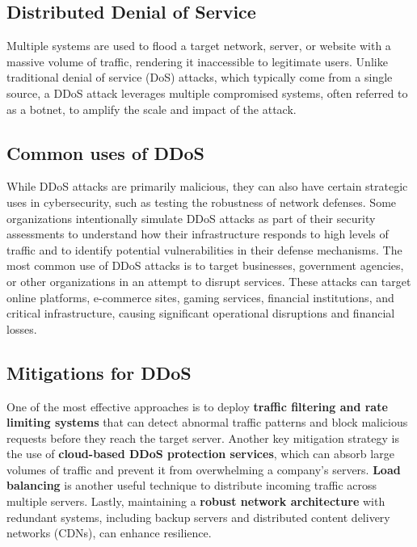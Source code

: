 \begin{center}
    \section{Distributed Denial of Service}
\end{center}
Multiple systems are used to flood a target network, server, or website with a massive volume of traffic, rendering it inaccessible to legitimate users. Unlike traditional denial of service (DoS) attacks, which typically come from a single source, a DDoS attack leverages multiple compromised systems, often referred to as a botnet, to amplify the scale and impact of the attack.

\subsection{Common uses of DDoS}
While DDoS attacks are primarily malicious, they can also have certain strategic uses in cybersecurity, such as testing the robustness of network defenses. Some organizations intentionally simulate DDoS attacks as part of their security assessments to understand how their infrastructure responds to high levels of traffic and to identify potential vulnerabilities in their defense mechanisms.
The most common use of DDoS attacks is to target businesses, government agencies, or other organizations in an attempt to disrupt services. These attacks can target online platforms, e-commerce sites, gaming services, financial institutions, and critical infrastructure, causing significant operational disruptions and financial losses.

\subsection{Mitigations for DDoS}
One of the most effective approaches is to deploy \textbf{traffic filtering and rate limiting systems} that can detect abnormal traffic patterns and block malicious requests before they reach the target server. Another key mitigation strategy is the use of \textbf{cloud-based DDoS protection services}, which can absorb large volumes of traffic and prevent it from overwhelming a company’s servers. \textbf{Load balancing} is another useful technique to distribute incoming traffic across multiple servers. Lastly, maintaining a \textbf{robust network architecture} with redundant systems, including backup servers and distributed content delivery networks (CDNs), can enhance resilience.



